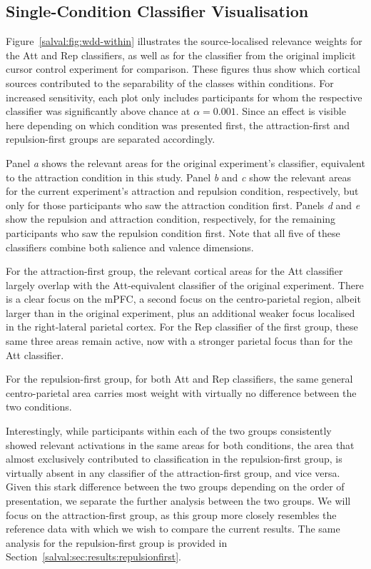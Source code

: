 \subsection{Single-Condition Classifier Visualisation}

Figure~\ref{salval:fig:wdd-within} illustrates the source-localised relevance weights for the Att and Rep classifiers, as well as for the classifier from the original implicit cursor control experiment for comparison. These figures thus show which cortical sources contributed to the separability of the classes within conditions. For increased sensitivity, each plot only includes participants for whom the respective classifier was significantly above chance at $\alpha=0.001$. Since an effect is visible here depending on which condition was presented first, the attraction-first and repulsion-first groups are separated accordingly.

Panel \emph{a} shows the relevant areas for the original experiment's classifier, equivalent to the attraction condition in this study. Panel \emph{b} and \emph{c} show the relevant areas for the current experiment's attraction and repulsion condition, respectively, but only for those participants who saw the attraction condition first. Panels \emph{d} and \emph{e} show the repulsion and attraction condition, respectively, for the remaining participants who saw the repulsion condition first. Note that all five of these classifiers combine both salience and valence dimensions. 

For the attraction-first group, the relevant cortical areas for the Att classifier largely overlap with the Att-equivalent classifier of the original experiment. There is a clear focus on the mPFC, a second focus on the centro-parietal region, albeit larger than in the original experiment, plus an additional weaker focus localised in the right-lateral parietal cortex. For the Rep classifier of the first group, these same three areas remain active, now with a stronger parietal focus than for the Att classifier.

For the repulsion-first group, for both Att and Rep classifiers, the same general centro-parietal area carries most weight with virtually no difference between the two conditions.

Interestingly, while participants within each of the two groups consistently showed relevant activations in the same areas for both conditions, the area that almost exclusively contributed to classification in the repulsion-first group, is virtually absent in any classifier of the attraction-first group, and vice versa. Given this stark difference between the two groups depending on the order of presentation, we separate the further analysis between the two groups. We will focus on the attraction-first group, as this group more closely resembles the reference data with which we wish to compare the current results. The same analysis for the repulsion-first group is provided in Section~\ref{salval:sec:results:repulsionfirst}.


